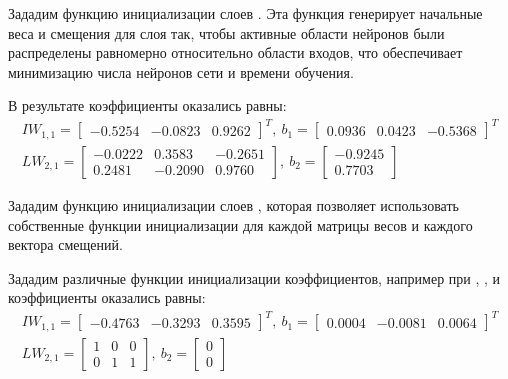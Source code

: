 %

Зададим функцию инициализации слоев . Эта функция генерирует начальные веса и смещения для слоя так, чтобы активные области нейронов были распределены равномерно относительно области входов, что обеспечивает минимизацию числа нейронов сети и времени обучения.



В результате коэффициенты оказались равны:
\begin{gather*}
IW_{1,1} = \begin{bmatrix} -0.5254 & -0.0823 & 0.9262 \end{bmatrix}^T,\
b_1 = \begin{bmatrix} 0.0936 & 0.0423 & -0.5368 \end{bmatrix}^T \\
LW_{2,1} = \begin{bmatrix} -0.0222 & 0.3583 & -0.2651 \\ 0.2481 & -0.2090 & 0.9760 \end{bmatrix},\ 
b_2 = \begin{bmatrix} -0.9245 \\ 0.7703 \end{bmatrix}
\end{gather*}

Зададим функцию инициализации слоев , которая позволяет использовать собственные функции инициализации для каждой матрицы весов и каждого вектора смещений. 



Зададим различные функции инициализации коэффициентов, например при , ,  и  коэффициенты оказались равны:
\begin{gather*}
IW_{1,1} = \begin{bmatrix} -0.4763 & -0.3293 & 0.3595 \end{bmatrix}^T,\
b_1 = \begin{bmatrix} 0.0004 & -0.0081 & 0.0064 \end{bmatrix}^T \\
LW_{2,1} = \begin{bmatrix} 1 & 0 & 0 \\ 0 & 1 & 1 \end{bmatrix},\ 
b_2 = \begin{bmatrix} 0 \\ 0 \end{bmatrix}
\end{gather*}

